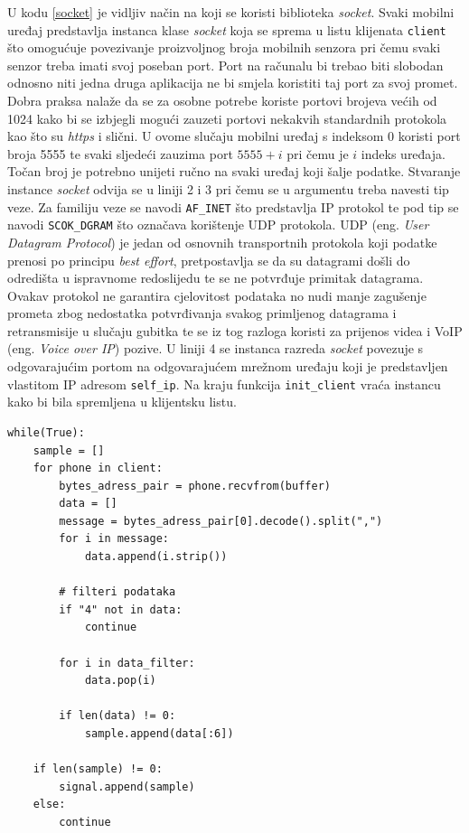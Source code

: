 \documentclass[times, utf8, diplomski]{fer}
\begin{document}
U kodu \ref{socket} je vidljiv način na koji se koristi biblioteka \textit{socket}. Svaki mobilni uređaj predstavlja instanca klase \textit{socket} koja se sprema
u listu klijenata \texttt{client} što omogućuje povezivanje proizvoljnog broja mobilnih senzora pri čemu svaki senzor treba imati svoj poseban port. Port na računalu
bi trebao biti slobodan odnosno niti jedna druga aplikacija ne bi smjela koristiti taj port za svoj promet. Dobra praksa nalaže da se za osobne potrebe koriste portovi
brojeva većih od 1024 kako bi se izbjegli mogući zauzeti portovi nekakvih standardnih protokola kao što su \textit{https} i slični. U ovome slučaju mobilni uređaj
s indeksom 0 koristi port broja 5555 te svaki sljedeći zauzima port $5555 + i$ pri čemu je $i$ indeks uređaja. Točan broj je potrebno unijeti ručno na svaki uređaj
koji šalje podatke. Stvaranje instance \textit{socket} odvija se u liniji 2 i 3 pri čemu se u argumentu treba navesti tip veze. Za familiju veze se navodi
\texttt{AF\_INET} što predstavlja IP protokol te pod tip se navodi \texttt{SCOK\_DGRAM} što označava korištenje UDP protokola. UDP (eng. \textit{User Datagram Protocol})
je jedan od osnovnih transportnih protokola koji podatke prenosi po principu \textit{best effort}, pretpostavlja se da su datagrami došli do odredišta u ispravnome redoslijedu
te se ne potvrđuje primitak datagrama. Ovakav protokol ne garantira cjelovitost podataka no nudi manje zagušenje prometa zbog nedostatka potvrđivanja svakog primljenog
datagrama i retransmisije u slučaju gubitka te se iz tog razloga koristi za prijenos videa i VoIP (eng. \textit{Voice over IP}) pozive. U liniji 4 se instanca razreda
\textit{socket} povezuje s odgovarajućim portom na odgovarajućem mrežnom uređaju koji je predstavljen vlastitom IP adresom \texttt{self\_ip}. Na kraju funkcija
\texttt{init\_client} vraća instancu kako bi bila spremljena u klijentsku listu.

\begin{lstlisting}[caption=Primanje podataka, label=primanje]
while(True):
    sample = []
    for phone in client:
        bytes_adress_pair = phone.recvfrom(buffer)
        data = []
        message = bytes_adress_pair[0].decode().split(",")
        for i in message:
            data.append(i.strip())

        # filteri podataka
        if "4" not in data:
            continue

        for i in data_filter:
            data.pop(i)
        
        if len(data) != 0:
            sample.append(data[:6])
            
    if len(sample) != 0:
        signal.append(sample)
    else:
        continue
\end{lstlisting}
\end{document}
